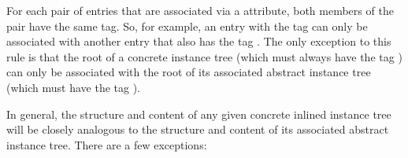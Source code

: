 For each pair of entries that are associated via a
 attribute, both members of the pair
have the same tag. So, for example, an entry with the tag
 can only be associated with another entry
that also has the tag . The only exception
to this rule is that the root of a concrete instance tree
(which must always have the tag )
can only be associated with the root of its associated abstract
instance tree (which must have the tag ).

In general, the structure and content of any given concrete
inlined instance tree will be closely analogous to the
structure and content of its associated abstract instance
tree. There are a few exceptions:

